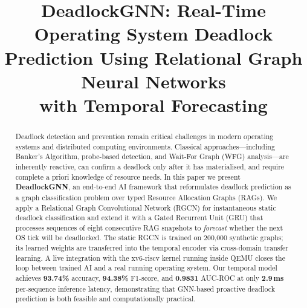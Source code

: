 \documentclass[conference]{IEEEtran}
\begin{document}
\title{DeadlockGNN: Real-Time Operating System Deadlock\\
Prediction Using Relational Graph Neural Networks\\
with Temporal Forecasting}

\author{
  \and
  \and
  \and
}

\maketitle

\begin{abstract}
Deadlock detection and prevention remain critical challenges in modern operating
systems and distributed computing environments. Classical approaches—including
Banker's Algorithm, probe-based detection, and Wait-For Graph (WFG) analysis—are
inherently reactive, can confirm a deadlock only after it has materialised, and
require complete a priori knowledge of resource needs. In this paper we present
\textbf{DeadlockGNN}, an end-to-end AI framework that reformulates deadlock
prediction as a graph classification problem over typed Resource Allocation
Graphs (RAGs). We apply a Relational Graph Convolutional Network (RGCN) for
instantaneous static deadlock classification and extend it with a Gated Recurrent
Unit (GRU) that processes sequences of eight consecutive RAG snapshots to
\emph{forecast} whether the next OS tick will be deadlocked. The static RGCN is
trained on 200,000 synthetic graphs; its learned weights are transferred into
the temporal encoder via cross-domain transfer learning. A live integration with
the xv6-riscv kernel running inside QEMU closes the loop between trained AI and
a real running operating system. Our temporal model achieves \textbf{93.74\%}
accuracy, \textbf{94.38\%} F1-score, and \textbf{0.9831} AUC-ROC at only
\textbf{2.9\,ms} per-sequence inference latency, demonstrating that GNN-based
proactive deadlock prediction is both feasible and computationally practical.
\end{abstract}
\end{document}
